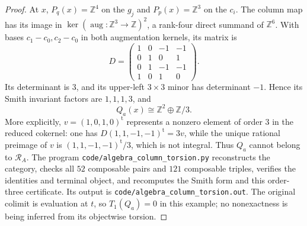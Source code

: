 \begin{proof}
At $x$, $P_q(x)=\mathbb Z^4$ on the $g_j$ and $P_p(x)=\mathbb Z^3$
on the $c_i$.  The column map has its image in
$\ker(\operatorname{aug}:\mathbb Z^3\to\mathbb Z)^2$, a rank-four
direct summand of $\mathbb Z^6$.  With bases $c_1-c_0,c_2-c_0$ in
both augmentation kernels, its matrix is
\[
 D=\begin{pmatrix}
 1&0&-1&-1\\
 0&1&0&1\\
 0&1&-1&-1\\
 1&0&1&0
 \end{pmatrix}.
\]
Its determinant is $3$, and its upper-left $3\times3$ minor has
determinant $-1$.  Hence its Smith invariant factors are
$1,1,1,3$, and
\[
 Q_a(x)\cong\mathbb Z^2\oplus\mathbb Z/3.
\]
More explicitly, $v=(1,0,1,0)^{\mathrm t}$ represents a nonzero
element of order $3$ in the reduced cokernel: one has
$D(1,1,-1,-1)^{\mathrm t}=3v$, while the unique rational preimage
of $v$ is $(1,1,-1,-1)^{\mathrm t}/3$, which is not integral.
Thus $Q_a$ cannot belong to $\mathcal R_A$.
The program \texttt{code/algebra\_column\_torsion.py} reconstructs
the category, checks all $52$ composable pairs and $121$ composable
triples, verifies the identities and terminal object, and recomputes
the Smith form and this order-three certificate.  Its output is
\texttt{code/algebra\_column\_torsion.out}.  The original colimit is
evaluation at $t$, so $T_1(Q_a)=0$ in this example; no nonexactness is
being inferred from its objectwise torsion.
\end{proof}
